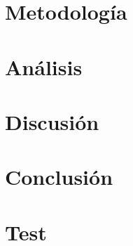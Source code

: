 \documentclass[english, a4paper, 12pt, twoside, openany]{book}
\numberwithin{equation}{section}                %
\begin{document}
\chapter{Metodología}
    
\clearpage
  
\chapter{Análisis}
    
\clearpage

\chapter{Discusión}
    
\clearpage

\chapter{Conclusión}
    
\clearpage

\newpage
\renewcommand\refname{Referencias}          %
{                           %
}

\newpage
\renewcommand{\appendixpagename}{Apéndices}     %

\appendix   %

\chapter{Test}                      %
\clearpage


%    

\end{document}
